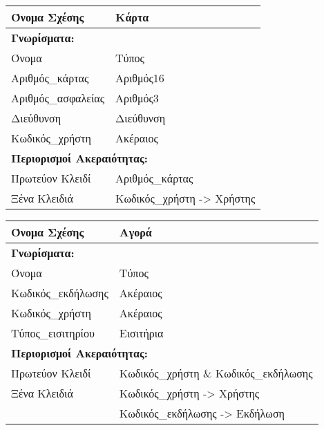 \begin{tabular}{|p{6cm}|p{8cm}|}
  \hline
  Όνομα Σχέσης      & Κάρτα                                \\ \hline
  \multicolumn{2}{|l|}{\textbf{Γνωρίσματα:}}               \\ \hline
  Όνομα             & Τύπος                                \\ \hline
  Αριθμός\_κάρτας    & Αριθμός16                            \\ \hline
  Αριθμός\_ασφαλείας & Αριθμός3                             \\ \hline
  Διεύθυνση         & Διεύθυνση                            \\ \hline
  Κωδικός\_χρήστη    & Ακέραιος                             \\ \hline
  \multicolumn{2}{|l|}{\textbf{Περιορισμοί Ακεραιότητας:}} \\ \hline
  Πρωτεύον Κλειδί   & Αριθμός\_κάρτας                       \\ \hline
  Ξένα Κλειδιά      & Κωδικός\_χρήστη -> Χρήστης            \\ \hline
\end{tabular}

\begin{tabular}{|p{6cm}|p{8cm}|}
  \hline
  Όνομα Σχέσης      & Αγορά                                \\ \hline
  \multicolumn{2}{|l|}{\textbf{Γνωρίσματα:}}               \\ \hline
  Όνομα             & Τύπος                                \\ \hline
  Κωδικός\_εκδήλωσης & Ακέραιος                             \\ \hline
  Κωδικός\_χρήστη    & Ακέραιος                             \\ \hline
  Τύπος\_εισιτηρίου  & Εισιτήρια                            \\ \hline
  \multicolumn{2}{|l|}{\textbf{Περιορισμοί Ακεραιότητας:}} \\ \hline
  Πρωτεύον Κλειδί   & Κωδικός\_χρήστη \& Κωδικός\_εκδήλωσης  \\ \hline
  Ξένα Κλειδιά      & Κωδικός\_χρήστη -> Χρήστης            \\ \hline
                    & Κωδικός\_εκδήλωσης -> Εκδήλωση        \\ \hline
\end{tabular}

